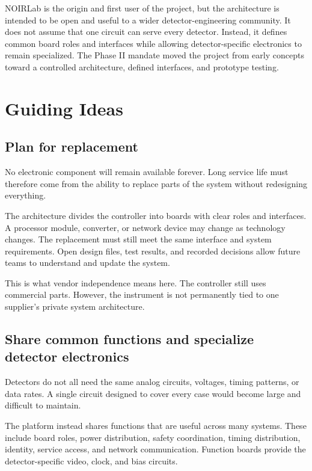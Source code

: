 NOIRLab is the origin and first user of the project, but the architecture is intended to be open and useful to a wider detector-engineering community. It does not assume that one circuit can serve every detector. Instead, it defines common board roles and interfaces while allowing detector-specific electronics to remain specialized. The Phase II mandate moved the project from early concepts toward a controlled architecture, defined interfaces, and prototype testing.

\section{Guiding Ideas}

\subsection{Plan for replacement}

No electronic component will remain available forever. Long service life must therefore come from the ability to replace parts of the system without redesigning everything.

The architecture divides the controller into boards with clear roles and interfaces. A processor module, converter, or network device may change as technology changes. The replacement must still meet the same interface and system requirements. Open design files, test results, and recorded decisions allow future teams to understand and update the system.

This is what vendor independence means here. The controller still uses commercial parts. However, the instrument is not permanently tied to one supplier's private system architecture.

\subsection{Share common functions and specialize detector electronics}

Detectors do not all need the same analog circuits, voltages, timing patterns, or data rates. A single circuit designed to cover every case would become large and difficult to maintain.

The platform instead shares functions that are useful across many systems. These include board roles, power distribution, safety coordination, timing distribution, identity, service access, and network communication. Function boards provide the detector-specific video, clock, and bias circuits.

